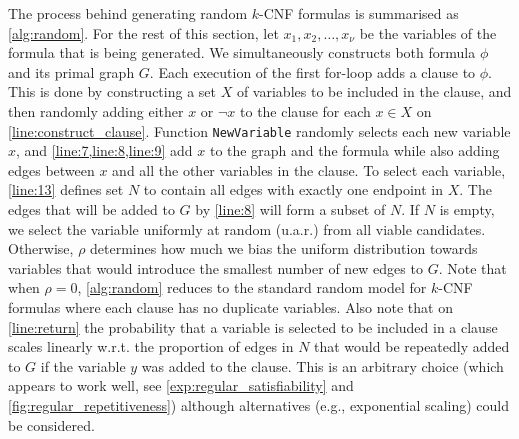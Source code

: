 \documentclass{article}
\theoremstyle{definition}
\theoremstyle{remark}
\begin{document}
The process behind generating random $k$-CNF formulas is summarised as
\cref{alg:random}. For the rest of this section, let $x_1, x_2, \dots, x_\nu$ be
the variables of the formula that is being generated. We simultaneously
constructs both formula $\phi$ and its primal graph $G$. Each execution of the
first for-loop adds a clause to $\phi$. This is done by constructing a set $X$
of variables to be included in the clause, and then randomly adding either $x$
or $\neg x$ to the clause for each $x \in X$ on \cref{line:construct_clause}.
Function \texttt{NewVariable} randomly selects each new variable $x$, and
\cref{line:7,line:8,line:9} add $x$ to the graph and the formula while also
adding edges between $x$ and all the other variables in the clause. To select
each variable, \cref{line:13} defines set $N$ to contain all edges with exactly
one endpoint in $X$. The edges that will be added to $G$ by \cref{line:8} will
form a subset of $N$. If $N$ is empty, we select the variable uniformly at
random (u.a.r.) from all viable candidates. Otherwise, $\rho$ determines how
much we bias the uniform distribution towards variables that would introduce the
smallest number of new edges to $G$. Note that when $\rho=0$, \cref{alg:random}
reduces to the standard random model for $k$-CNF formulas where each clause has
no duplicate variables. Also note that on \cref{line:return} the probability
that a variable is selected to be included in a clause scales linearly w.r.t.
the proportion of edges in $N$ that would be repeatedly added to $G$ if the
variable $y$ was added to the clause. This is an arbitrary choice (which appears
to work well, see \cref{exp:regular_satisfiability} and
\cref{fig:regular_repetitiveness}) although alternatives (e.g., exponential
scaling) could be considered.
\end{document}
